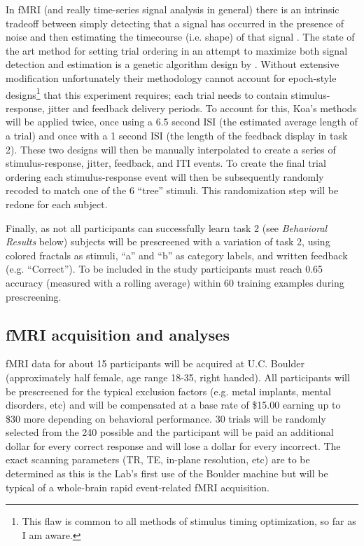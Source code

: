 \documentclass[doc,12pt]{apa}        %
\begin{document}
In fMRI (and really time-series signal analysis in general) there is an intrinsic tradeoff between simply detecting that a signal has occurred in the presence of noise and then estimating the timecourse (i.e. shape) of that signal \cite{Dale:1999p7901,Birn:2002p1777,Liu:2004p2141}.   The state of the art method for setting trial ordering in an attempt to maximize both signal detection and estimation is a genetic algorithm design by .  Without extensive modification unfortunately their methodology cannot account for epoch-style designs\footnote{This flaw is common to all methods of stimulus timing optimization, so far as I am aware.} that this experiment requires; each trial needs to contain stimulus-response, jitter and feedback delivery periods.  To account for this, Koa's methods will be applied twice, once using a 6.5 second ISI (the estimated average length of a trial) and once with a 1 second ISI (the length of the feedback display in task 2).  These two designs will then be manually interpolated to create a series of stimulus-response, jitter, feedback, and ITI events.  To create the final trial ordering each stimulus-response event will then be subsequently randomly recoded to match one of the 6 ``tree'' stimuli.  This randomization step will be redone for each subject.  

Finally, as not all participants can successfully learn task 2 (see \emph{Behavioral Results} below) subjects will be prescreened with a variation of task 2, using colored fractals as stimuli, ``a'' and ``b'' as category labels, and written feedback (e.g. ``Correct'').  To be included in the study participants must reach 0.65 accuracy (measured with a rolling average) within 60 training examples during prescreening.

\subsection{fMRI acquisition and analyses} %
\label{sub:fmri}

fMRI data for about 15 participants will be acquired at U.C. Boulder (approximately half female, age range 18-35, right handed).   All participants will be prescreened for the typical exclusion factors (e.g. metal implants, mental disorders, etc) and will be compensated at a base rate of \$15.00 earning up to \$30 more depending on behavioral performance. 30 trials will be randomly selected from the 240 possible and the participant will be paid an additional dollar for every correct response and will lose a dollar for every incorrect.  The exact scanning parameters (TR, TE, in-plane resolution, etc) are to be determined as this is the Lab's first use of the Boulder machine but will be typical of a whole-brain rapid event-related fMRI acquisition.
\end{document}
